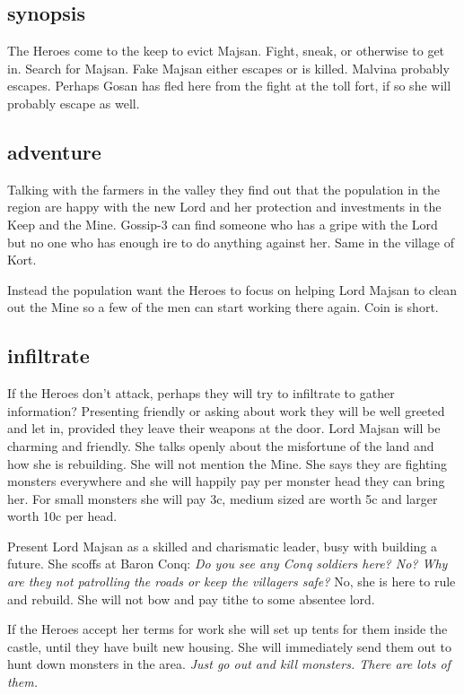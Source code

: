 \subsection*{synopsis}
The Heroes come to the keep to evict Majsan. Fight, sneak, or otherwise to get in. Search for Majsan. Fake Majsan either escapes or is killed. Malvina probably escapes. Perhaps Gosan has fled here from the fight at the toll fort, if so she will probably escape as well.


\subsection*{adventure}
Talking with the farmers in the valley they find out that the population in the region are happy with the new Lord and her protection and investments in the Keep and the Mine. Gossip-3 can find someone who has a gripe with the Lord but no one who has enough ire to do anything against her. Same in the village of Kort.

Instead the population want the Heroes to focus on helping Lord Majsan to clean out the Mine so a few of the men can start working there again. Coin is short.


\subsection*{infiltrate}
If the Heroes don't attack, perhaps they will try to infiltrate to gather information? Presenting friendly or asking about work they will be well greeted and let in, provided they leave their weapons at the door. Lord Majsan will be charming and friendly. She talks openly about the misfortune of the land and how she is rebuilding. She will not mention the Mine. She says they are fighting monsters everywhere and she will happily pay per monster head they can bring her. For small monsters she will pay 3c, medium sized are worth 5c and larger worth 10c per head.

Present Lord Majsan as a skilled and charismatic leader, busy with building a future. She scoffs at Baron Conq: \textit{Do you see any Conq soldiers here? No? Why are they not patrolling the roads or keep the villagers safe?} No, she is here to rule and rebuild. She will not bow and pay tithe to some absentee lord.

If the Heroes accept her terms for work she will set up tents for them inside the castle, until they have built new housing. She will immediately send them out to hunt down monsters in the area. \textit{Just go out and kill monsters. There are lots of them.}


